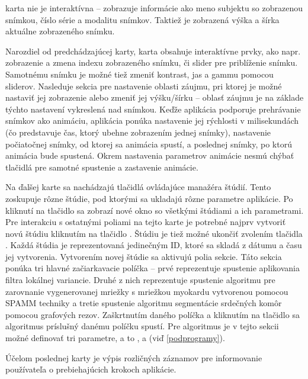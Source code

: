 { karta nie je interaktívna -- zobrazuje informácie ako meno subjektu so zobrazenou snímkou, číslo série a modalitu snímkov. Taktiež je zobrazená výška a šírka aktuálne zobrazeného snímku.

Narozdiel od predchádzajúcej karty,  karta obsahuje interaktívne prvky, ako napr. zobrazenie a zmena indexu zobrazeného snímku, či slider pre priblíženie snímku. Samotnému snímku je možné tiež zmeniť kontrast, jas a gammu pomocou sliderov. Nasleduje sekcia pre nastavenie  oblasti záujmu, pri ktorej je možné nastaviť jej zobrazenie alebo zmeniť jej výšku/šírku -- oblasť záujmu je na základe týchto nastavení vykreslená nad snímkou. Keďže aplikácia podporuje prehrávanie snímkov ako animáciu, aplikácia ponúka nastavenie jej rýchlosti v milisekundách (čo predstavuje čas, ktorý ubehne zobrazením jednej snímky), nastavenie počiatočnej snímky, od ktorej sa animácia spustí, a poslednej snímky, po ktorú animácia bude spustená. Okrem nastavenia parametrov animácie nesmú chýbať tlačidlá pre samotné spustenie a zastavenie animácie.

Na ďalšej karte  sa nachádzajú tlačidlá ovládajúce manažéra štúdií. Tento  zoskupuje rôzne štúdie, pod ktorými sa ukladajú rôzne parametre aplikácie. Po kliknutí na tlačidlo  sa zobrazí nové okno so všetkými štúdiami a ich parametrami.
Pre interakciu s ostatnými poliami na tejto karte je potrebné najprv vytvoriť novú štúdiu kliknutím na tlačidlo . Štúdiu je tiež možné ukončiť zvolením tlačidla . Každá štúdia je reprezentovaná jedinečným ID, ktoré sa skladá z dátumu a času jej vytvorenia.
Vytvorením novej štúdie sa aktivujú polia  sekcie. Táto sekcia ponúka tri hlavné začiarkavacie políčka -- prvé reprezentuje spustenie aplikovania filtra lokálnej variancie. Druhé z nich reprezentuje spustenie algoritmu pre zarovnanie vygenerovanej mriežky s mriežkou myokardu vytvorenou pomocou SPAMM techniky a tretie spustenie algoritmu segmentácie srdečných komôr pomocou grafových rezov. Zaškrtnutím daného políčka a kliknutím na tlačidlo  sa algoritmus príslušný danému políčku spustí. Pre  algoritmus je v tejto sekcii možné definovať tri parametre, a to ,  a  (viď \ref{podprogramy}).

Účelom poslednej karty  je výpis rozličných záznamov pre informovanie používateľa o prebiehajúcich krokoch aplikácie. \newline

}
